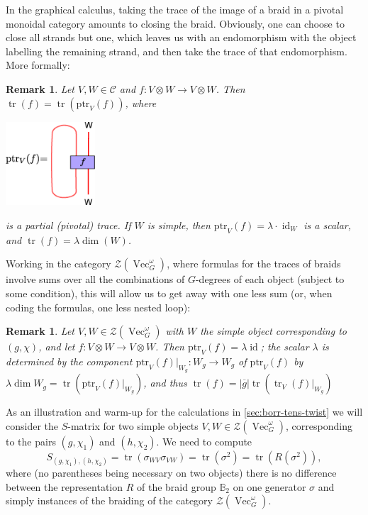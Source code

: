 \documentclass[a4paper, 10pt]{book}
\newtheorem{Rem}[theorem]{Remark}
\theoremstyle{definition}
\numberwithin{equation}{chapter}
\newcommand\tr{\operatorname{tr}}
\newcommand\ptr{\text{ptr}}
\newcommand\id{\operatorname{id}}
\newcommand\ot{\otimes}
\newcommand\Vect{\operatorname{Vec}}
\newcommand\C{\mathcal C}
\newcommand\CTR{\mathcal Z}
\begin{document}
In the graphical calculus, taking the trace of the image of a braid in a pivotal monoidal category amounts to closing the braid. Obviously, one can choose to close all strands but one, which leaves us with an endomorphism with the object labelling the remaining strand, and then take the trace of that endomorphism. More formally:
\begin{Rem}\label{pretrick}\rm
  Let $V,W\in\C$ and $f\colon V\ot W\to V\ot W$. Then
  $\tr(f)=\tr(\ptr_V(f))$, where
\begin{center}
\includegraphics[width=0.25\textwidth]{ptr.eps}
\end{center}
  is a partial (pivotal) trace. If $W$ is simple, then $\ptr_V(f)=\lambda\cdot\id_W$ is a scalar, and $\tr(f)=\lambda\dim(W)$.
\end{Rem}

Working in the category $\CTR(\Vect_G^\omega)$, where formulas for the traces of braids involve sums over all the combinations of $G$-degrees of each object (subject to some condition), this will allow us to get away with one less sum (or, when coding the formulas, one less nested loop):
\begin{Rem}\label{trick}\rm
  Let $V,W\in\CTR(\Vect_G^\omega)$ with $W$ the simple object corresponding to $(g,\chi)$, and let $f\colon V\ot W\to V\ot W$. Then $\ptr_V(f)=\lambda\id$; the scalar $\lambda$ is determined by the component $\ptr_V(f)|_{W_g}\colon W_g\to W_g$ of $\ptr_V(f)$ by $\lambda\dim W_g=\tr(\ptr_V(f)|_{W_g})$, and thus $\tr(f)=|\overline g|\tr(\tr_V(f)|_{W_g})$
\end{Rem}

As an illustration and warm-up for the calculations in \cref{sec:borr-tens-twist} we will consider the $S$-matrix for two simple objects $V,W\in\mathcal{Z}(\Vect^\omega_G)$, corresponding to the pairs $(g,\chi_1)$ and $(h, \chi_2)$. We need to compute
\begin{equation*}
  S_{(g,\chi_1),(h,\chi_2)}=\tr(\sigma_{WV}\sigma_{VW})=\tr(\sigma^2)=\tr(R(\sigma^2)),
\end{equation*}
where (no parentheses being necessary on two objects) there is no difference between the representation $R$ of the braid group $\mathbb B_2$ on one generator $\sigma$ and simply instances of the braiding of the category $\CTR(\Vect_G^\omega)$.
\end{document}
